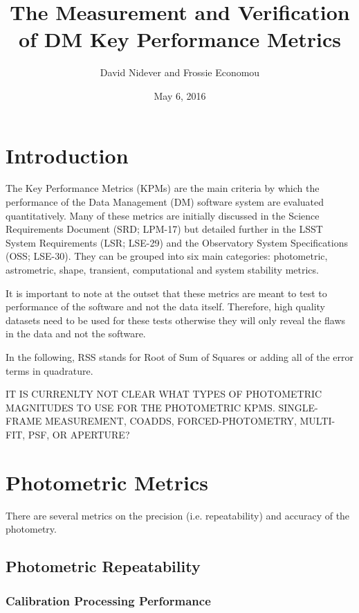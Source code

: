 \documentclass[DM,lsstdraft,toc]{lsstdoc}
\title[Measurement and Verification of KPMs]{The Measurement and Verification of DM Key Performance Metrics}
\author{David Nidever and Frossie Economou}
\date{May 6, 2016}
\begin{document}
\maketitle

\section{Introduction}\label{introduction}

The Key Performance Metrics (KPMs) are the main criteria by which the
performance of the Data Management (DM) software system are evaluated
quantitatively. Many of these metrics are initially discussed in the
Science Requirements Document (SRD; LPM-17) but detailed further in the
LSST System Requirements (LSR; LSE-29) and the Observatory System
Specifications (OSS; LSE-30). They can be grouped into six main
categories: photometric, astrometric, shape, transient, computational
and system stability metrics.

It is important to note at the outset that these metrics are meant to
test to performance of the software and not the data itself. Therefore,
high quality datasets need to be used for these tests otherwise they
will only reveal the flaws in the data and not the software.

In the following, RSS stands for Root of Sum of Squares or adding all of
the error terms in quadrature.

IT IS CURRENLTY NOT CLEAR WHAT TYPES OF PHOTOMETRIC MAGNITUDES TO USE
FOR THE PHOTOMETRIC KPMS. SINGLE-FRAME MEASUREMENT, COADDS,
FORCED-PHOTOMETRY, MULTI-FIT, PSF, OR APERTURE?

\section{Photometric Metrics}\label{photometric-metrics}

There are several metrics on the precision (i.e. repeatability) and
accuracy of the photometry.

\subsection{Photometric Repeatability}\label{photometric-repeatability}

\subsubsection{Calibration Processing
Performance}\label{calibration-processing-performance}
\end{document}
